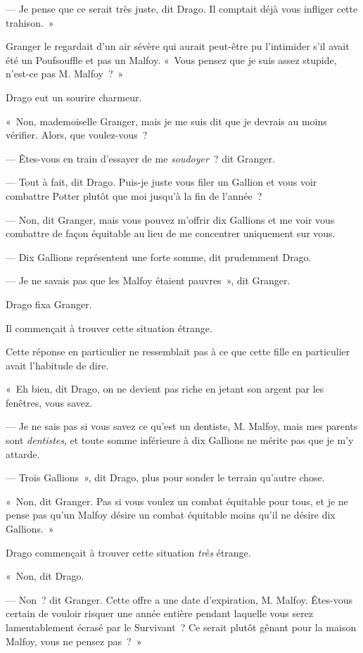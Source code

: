 --- Je pense que ce serait très juste, dit Drago.
Il comptait déjà vous infliger cette trahison.~»

Granger le regardait d'un air sévère qui aurait peut-être pu l'intimider s'il avait été un Poufsouffle et pas un Malfoy.
«~Vous pensez que je suis assez stupide, n'est-ce pas M. Malfoy~?~»

Drago eut un sourire charmeur.

«~Non, mademoiselle Granger, mais je me suis dit que je devrais au moins vérifier.
Alors, que voulez-vous~?

--- Êtes-vous en train d'essayer de me \emph{soudoyer}~? dit Granger.

--- Tout à fait, dit Drago.
Puis-je juste vous filer un Gallion et vous voir combattre Potter plutôt que moi jusqu'à la fin de l'année~?

--- Non, dit Granger, mais vous pouvez m'offrir dix Gallions et me voir vous combattre de façon équitable au lieu de me concentrer uniquement sur vous.

--- Dix Gallions représentent une forte somme, dit prudemment Drago.

--- Je ne savais pas que les Malfoy étaient pauvres~», dit Granger.

Drago fixa Granger.

Il commençait à trouver cette situation étrange.

Cette réponse en particulier ne ressemblait pas à ce que cette fille en particulier avait l'habitude de dire.

«~Eh bien, dit Drago, on ne devient pas riche en jetant son argent par les fenêtres, vous savez.

--- Je ne sais pas si vous savez ce qu'est un dentiste, M. Malfoy, mais mes parents sont \emph{dentistes}, et toute somme inférieure à dix Gallions ne mérite pas que je m'y attarde.

--- Trois Gallions~», dit Drago, plus pour sonder le terrain qu'autre chose.

«~Non, dit Granger.
Pas si vous voulez un combat équitable pour tous, et je ne pense pas qu'un Malfoy désire un combat équitable moins qu'il ne désire dix Gallions.~»

Drago commençait à trouver cette situation \emph{très} étrange.

«~Non, dit Drago.

--- Non~? dit Granger.
Cette offre a une date d'expiration, M. Malfoy.
Êtes-vous certain de vouloir risquer une année entière pendant laquelle vous serez lamentablement écrasé par le Survivant~?
Ce serait plutôt gênant pour la maison Malfoy, vous ne pensez pas~?~»


